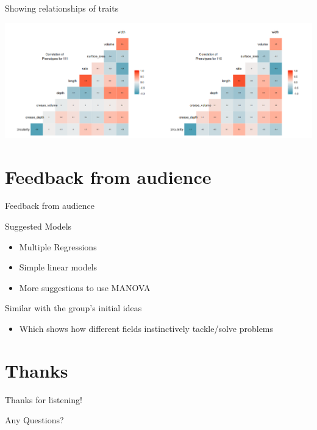 \documentclass[t, aspectratio=169]{beamer}
\begin{document}
\begin{frame}[label={sec:org4bfa1f7}]{Showing relationships of traits}
\begin{center}
\includegraphics[width=14cm]{./corrmatrix.png}
\end{center}
\end{frame}

\section{Feedback from audience}
\label{sec:org8164a83}
\begin{frame}[label={sec:org9b78510}]{Feedback from audience}
\begin{block}{Suggested Models}
\begin{itemize}
\item Multiple Regressions
\item Simple linear models
\item More suggestions to use MANOVA
\end{itemize}
\end{block}
\begin{block}{Similar with the group's initial ideas}
\begin{itemize}
\item Which shows how different fields instinctively tackle/solve problems
\end{itemize}
\end{block}
\end{frame}


\section{Thanks}
\label{sec:org5336ef6}

\begin{frame}[label={sec:org9c92378}]{Thanks for listening!}
\begin{block}{Any Questions?}
\end{block}
\end{frame}
\end{document}
